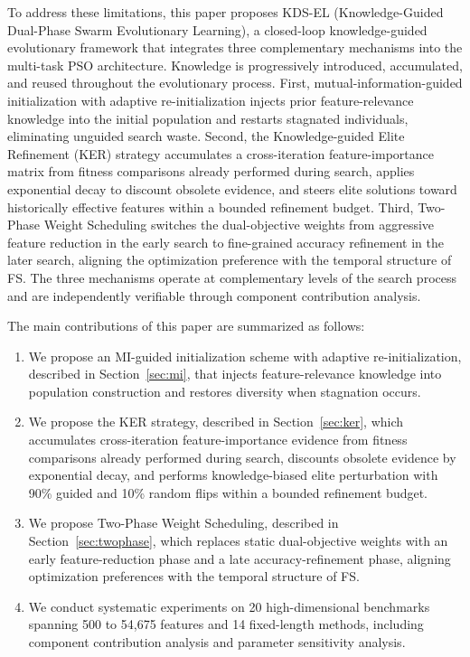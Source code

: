 To address these limitations, this paper proposes KDS-EL (Knowledge-Guided Dual-Phase Swarm Evolutionary Learning), a closed-loop knowledge-guided evolutionary framework that integrates three complementary mechanisms into the multi-task PSO architecture. Knowledge is progressively introduced, accumulated, and reused throughout the evolutionary process. First, mutual-information-guided initialization with adaptive re-initialization injects prior feature-relevance knowledge into the initial population and restarts stagnated individuals, eliminating unguided search waste. Second, the Knowledge-guided Elite Refinement (KER) strategy accumulates a cross-iteration feature-importance matrix from fitness comparisons already performed during search, applies exponential decay to discount obsolete evidence, and steers elite solutions toward historically effective features within a bounded refinement budget. Third, Two-Phase Weight Scheduling switches the dual-objective weights from aggressive feature reduction in the early search to fine-grained accuracy refinement in the later search, aligning the optimization preference with the temporal structure of FS. The three mechanisms operate at complementary levels of the search process and are independently verifiable through component contribution analysis.

The main contributions of this paper are summarized as follows:
\begin{enumerate}
\item We propose an MI-guided initialization scheme with adaptive re-initialization, described in Section~\ref{sec:mi}, that injects feature-relevance knowledge into population construction and restores diversity when stagnation occurs.
\item We propose the KER strategy, described in Section~\ref{sec:ker}, which accumulates cross-iteration feature-importance evidence from fitness comparisons already performed during search, discounts obsolete evidence by exponential decay, and performs knowledge-biased elite perturbation with 90\% guided and 10\% random flips within a bounded refinement budget.
\item We propose Two-Phase Weight Scheduling, described in Section~\ref{sec:twophase}, which replaces static dual-objective weights with an early feature-reduction phase and a late accuracy-refinement phase, aligning optimization preferences with the temporal structure of FS.
\item We conduct systematic experiments on 20 high-dimensional benchmarks spanning 500 to 54{,}675 features and 14 fixed-length methods, including component contribution analysis and parameter sensitivity analysis.
\end{enumerate}

